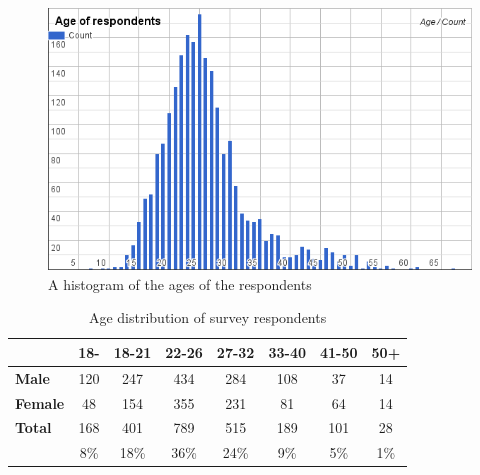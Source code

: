 \begin{figure}[h]
	\centering
	\includegraphics[width=\textwidth]{Figures/age-histogram}
	\caption{A histogram of the ages of the respondents}
	\label{fig:respondents-age-histogram}
\end{figure}

\begin{table}[h]
	\centering
	\caption{Age distribution of survey respondents}
	\label{tbl:survey-age-distribution}
	\begin{tabular}{|l||c|c|c|c|c|c|c|}
		\hline
		&\textbf{18-} & \textbf{18-21} & \textbf{22-26} & \textbf{27-32} & \textbf{33-40} & \textbf{41-50} & \textbf{50+}\\
		\hline\hline
		
		\textbf{Male} & 120 & 247 & 434 & 284 & 108 & 37 & 14 \\
		\hline
		
		\textbf{Female} & 48 & 154 & 355 & 231 & 81 & 64 & 14 \\
		\hline
		
		\textbf{Total} & 168 & 401 & 789 & 515 & 189 & 101 & 28 \\
						& 8\% & 18\% & 36\% & 24\% & 9\% & 5\% & 1\%\\
		\hline
	\end{tabular}
\end{table}



